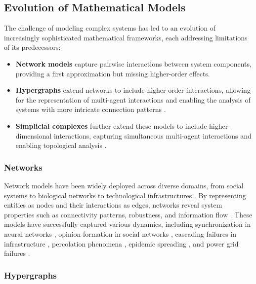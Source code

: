 \subsection{Evolution of Mathematical Models}

The challenge of modeling complex systems has led to an evolution of increasingly sophisticated mathematical frameworks, each addressing limitations of its predecessors:

\begin{itemize}[leftmargin=*]
  \item \textbf{Network models} capture pairwise interactions between system components, providing a first approximation but missing higher-order effects.

  \item \textbf{Hypergraphs} extend networks to include higher-order interactions, allowing for the representation of multi-agent interactions and enabling the analysis of systems with more intricate connection patterns \citep{benson2016higher, battiston2020networks}.

  \item \textbf{Simplicial complexes} further extend these models to include higher-dimensional interactions, capturing simultaneous multi-agent interactions and enabling topological analysis \citep{battiston2020networks, petri2014homological}.
\end{itemize}

\subsubsection{Networks}

Network models have been widely deployed across diverse domains, from social systems to biological networks to technological infrastructures \citep{boccaletti2006complex, newman2003structure}. By representing entities as nodes and their interactions as edges, networks reveal system properties such as connectivity patterns, robustness, and information flow \citep{barabasi2004network}. These models have successfully captured various dynamics, including synchronization in neural networks \citep{arenas2008synchronization}, opinion formation in social networks \citep{castellano2009statistical}, cascading failures in infrastructure \citep{watts2002simple}, percolation phenomena \citep{cohen2010complex}, epidemic spreading \citep{pastor2015epidemic}, and power grid failures \citep{dobson2007complex}.

\subsubsection{Hypergraphs}

